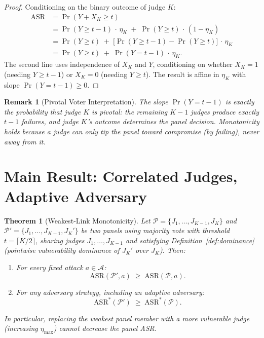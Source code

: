 \documentclass[11pt]{article}
\newtheorem{theorem}{Theorem}
\newtheorem*{remark}{Remark}
\begin{document}
\begin{proof}
Conditioning on the binary outcome of judge $K$:
\begin{align*}
    \mathrm{ASR}
    &= \Pr(Y + X_K \geq t) \\
    &= \Pr(Y \geq t{-}1)\,\cdot\,\eta_K \;+\; \Pr(Y \geq t)\,\cdot\,(1 - \eta_K) \\
    &= \Pr(Y \geq t) \;+\; \bigl[\Pr(Y \geq t{-}1) - \Pr(Y \geq t)\bigr]\,\cdot\,\eta_K \\
    &= \Pr(Y \geq t) \;+\; \Pr(Y = t{-}1)\,\cdot\,\eta_K.
\end{align*}
The second line uses independence of $X_K$ and $Y$, conditioning on whether $X_K = 1$ (needing $Y \geq t{-}1$) or $X_K = 0$ (needing $Y \geq t$). The result is affine in $\eta_K$ with slope $\Pr(Y = t{-}1) \geq 0$.
\end{proof}

\begin{remark}[Pivotal Voter Interpretation]
The slope $\Pr(Y = t{-}1)$ is exactly the probability that judge $K$ is \emph{pivotal}: the remaining $K{-}1$ judges produce exactly $t{-}1$ failures, and judge $K$'s outcome determines the panel decision. Monotonicity holds because a judge can only tip the panel toward compromise (by failing), never away from it.
\end{remark}


\section{Main Result: Correlated Judges, Adaptive Adversary}

\begin{theorem}[Weakest-Link Monotonicity]\label{thm:main}
Let $\mathcal{P} = \{J_1, \ldots, J_{K-1}, J_K\}$ and $\mathcal{P}' = \{J_1, \ldots, J_{K-1}, J_K'\}$ be two panels using majority vote with threshold $t = \lceil K/2 \rceil$, sharing judges $J_1, \ldots, J_{K-1}$ and satisfying Definition~\ref{def:dominance} (pointwise vulnerability dominance of $J_K'$ over $J_K$). Then:
\begin{enumerate}[label=(\alph*)]
    \item For every fixed attack $a \in \mathcal{A}$:
    \[
        \mathrm{ASR}(\mathcal{P}', a) \;\geq\; \mathrm{ASR}(\mathcal{P}, a).
    \]
    \item For any adversary strategy, including an adaptive adversary:
    \[
        \mathrm{ASR}^*(\mathcal{P}') \;\geq\; \mathrm{ASR}^*(\mathcal{P}).
    \]
\end{enumerate}
In particular, replacing the weakest panel member with a more vulnerable judge (increasing $\eta_{\max}$) cannot decrease the panel ASR.
\end{theorem}
\end{document}
